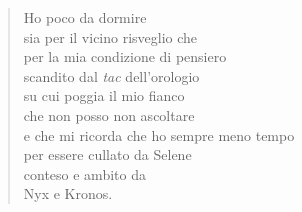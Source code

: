 
\begin{verse}
    Ho poco da dormire\\
    sia per il vicino risveglio che\\
    per la mia condizione di pensiero\\
    scandito dal \textit{tac} dell'orologio\\
    su cui poggia il mio fianco\\
    che non posso non ascoltare\\
    e che mi ricorda che ho sempre meno tempo\\
    per essere cullato da Selene\\
    conteso e ambito da\\
    Nyx e Kronos.    
\end{verse}
